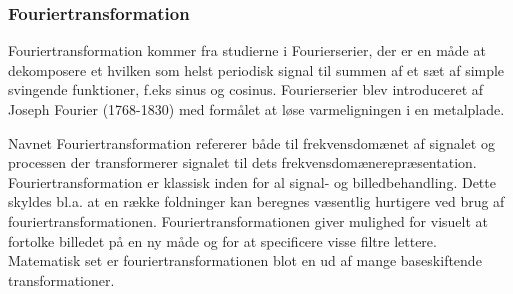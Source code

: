 \subsubsection{Fouriertransformation}
Fouriertransformation kommer fra studierne i Fourierserier, der er en måde at dekomposere et hvilken som helst periodisk signal til summen af et sæt af simple svingende funktioner, f.eks sinus og cosinus. Fourierserier blev introduceret af Joseph Fourier (1768-1830) med formålet at løse varmeligningen i en metalplade.

Navnet Fouriertransformation refererer både til frekvensdomænet af signalet og processen der transformerer signalet til dets frekvensdomænerepræsentation. Fouriertransformation er klassisk inden for al signal- og billedbehandling. Dette skyldes bl.a. at en række foldninger kan beregnes væsentlig hurtigere ved brug af fouriertransformationen. Fouriertransformationen giver mulighed for visuelt at fortolke billedet på en ny måde og for at specificere visse filtre lettere. Matematisk set er fouriertransformationen blot en ud af mange baseskiftende transformationer.



